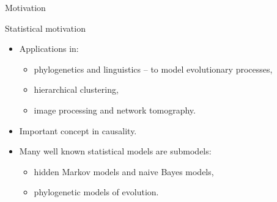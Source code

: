 \documentclass[dvipsnames,aspectratio=169]{beamer} %
\begin{document}
\begin{frame}{Motivation}
	\begin{alertblock}{Statistical motivation}
	\begin{itemize}
	\item Applications in: 
	\begin{itemize}
	\item phylogenetics and linguistics -- to model evolutionary processes,
	\item hierarchical clustering,
	\item image processing and network tomography.
	\end{itemize}
	\item Important concept in causality.
	\item Many well known statistical models are submodels:
	\begin{itemize}
	\item hidden Markov models and naive Bayes models,
	\item phylogenetic models of evolution.
	\end{itemize}
	\end{itemize}
	\end{alertblock}
%
\end{frame}
\end{document}
